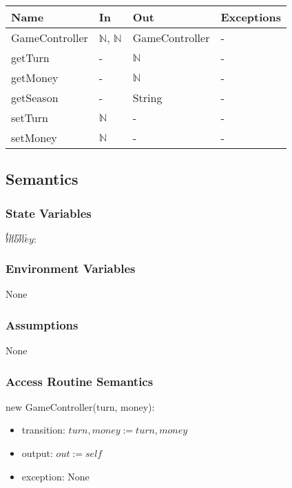 \documentclass[12pt, titlepage]{article}
\begin{document}
\begin{center}
\begin{tabular}{p{4cm} p{4cm} p{4cm} p{4cm}}
\hline
\textbf{Name} & \textbf{In} & \textbf{Out} & \textbf{Exceptions} \\
\hline
GameController & $\mathbb{N}$, $\mathbb{N}$ & GameController & - \\
\hline
getTurn & - & $\mathbb{N}$ & - \\
\hline
getMoney & - & $\mathbb{N}$ & - \\
\hline
getSeason & - & String & - \\
\hline
setTurn & $\mathbb{N}$ &-& - \\
\hline
setMoney & $\mathbb{N}$ &-& - \\
\hline
\end{tabular}
\end{center}

\subsection{Semantics}

\subsubsection{State Variables}
$\mathit{turn}:$ \\
$\mathit{money}:$ \\

\subsubsection{Environment Variables}

None

\subsubsection{Assumptions}

None

\subsubsection{Access Routine Semantics}

\noindent new GameController(turn, money):
\begin{itemize}
\item transition: $turn, money := turn, money$
\item output: $out := self$
\item exception: None
\end{itemize}
\end{document}
